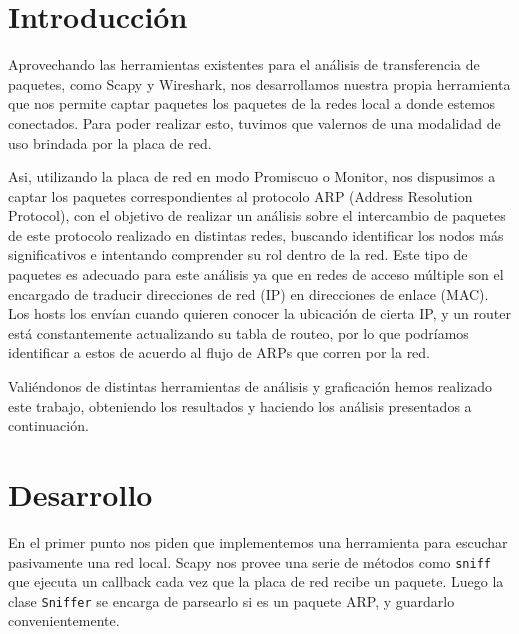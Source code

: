\documentclass[a4paper, 11pt]{article}
\begin{document}
\pagestyle{myheadings}
\maketitle

\thispagestyle{empty}
\tableofcontents

\newpage

\section{Introducción}

Aprovechando las herramientas existentes para el an\'alisis de transferencia de paquetes, como Scapy y Wireshark, nos desarrollamos nuestra propia herramienta que nos permite captar paquetes los paquetes de la redes local a donde estemos conectados. Para poder realizar esto, tuvimos que valernos de una modalidad de uso brindada por la placa de red.

Asi, utilizando la placa de red en modo Promiscuo o Monitor, nos dispusimos a captar los paquetes correspondientes al protocolo ARP (Address Resolution Protocol), con el objetivo de realizar un an\'alisis sobre el intercambio de paquetes de este protocolo realizado en distintas redes, buscando identificar los nodos m\'as significativos e intentando comprender su rol dentro de la red. Este tipo de paquetes es adecuado para este an\'alisis ya que en redes de acceso m\'ultiple son el encargado de traducir direcciones de red (IP) en direcciones de enlace (MAC). Los hosts los env\'ian cuando quieren conocer la ubicaci\'on de cierta IP, y un router est\'a constantemente actualizando su tabla de routeo, por lo que podr\'iamos identificar a estos de acuerdo al flujo de ARPs que corren por la red. 

Vali\'endonos de distintas herramientas de an\'alisis y graficaci\'on hemos realizado este trabajo, obteniendo los resultados y haciendo los an\'alisis presentados a continuaci\'on.

\section{Desarrollo}

En el primer punto nos piden que implementemos una herramienta para escuchar pasivamente una red local. Scapy nos provee una serie de m\'etodos como \texttt{sniff} que ejecuta un callback cada vez que la placa de red recibe un paquete. Luego la clase \texttt{Sniffer} se encarga de parsearlo si es un paquete ARP, y guardarlo convenientemente.  
\end{document}
